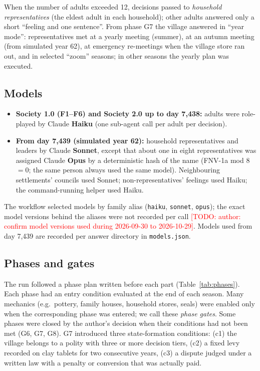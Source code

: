 \documentclass[11pt]{article}
\newcommand{\todo}[1]{\textcolor{red}{[TODO: #1]}}
\begin{document}
When the number of adults exceeded 12, decisions passed to \emph{household representatives} (the eldest adult in each household); other adults answered only a short ``feeling and one sentence''. From phase G7 the village answered in ``year mode'': representatives met at a yearly meeting (summer), at an autumn meeting (from simulated year 62), at emergency re-meetings when the village store ran out, and in selected ``zoom'' seasons; in other seasons the yearly plan was executed.

\subsection{Models}
\begin{itemize}
  \item \textbf{Society 1.0 (F1--F6) and Society 2.0 up to day 7{,}438:} adults were role-played by Claude \textbf{Haiku} (one sub-agent call per adult per decision).
  \item \textbf{From day 7{,}439 (simulated year 62):} household representatives and leaders by Claude \textbf{Sonnet}, except that about one in eight representatives was assigned Claude \textbf{Opus} by a deterministic hash of the name (FNV-1a mod 8 $=0$; the same person always used the same model). Neighbouring settlements' councils used Sonnet; non-representatives' feelings used Haiku; the command-running helper used Haiku.
\end{itemize}
The workflow selected models by family alias (\texttt{haiku}, \texttt{sonnet}, \texttt{opus}); the exact model versions behind the aliases were not recorded per call \todo{author: confirm model versions used during 2026-09-30 to 2026-10-29}. Models used from day 7{,}439 are recorded per answer directory in \texttt{models.json}.

\subsection{Phases and gates}
The run followed a phase plan written before each part (Table~\ref{tab:phases}). Each phase had an entry condition evaluated at the end of each season. Many mechanics (e.g.\ pottery, family houses, household stores, seals) were enabled only when the corresponding phase was entered; we call these \emph{phase gates}. Some phases were closed by the author's decision when their conditions had not been met (G6, G7, G8). G7 introduced three state-formation conditions: (c1) the village belongs to a polity with three or more decision tiers, (c2) a fixed levy recorded on clay tablets for two consecutive years, (c3) a dispute judged under a written law with a penalty or conversion that was actually paid.
\end{document}
